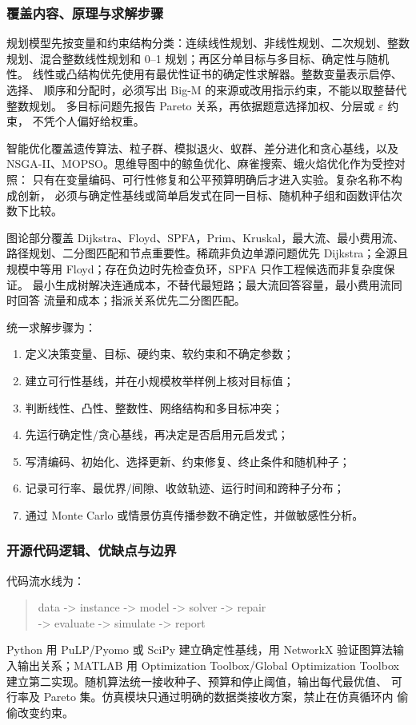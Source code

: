 \documentclass[UTF8,a4paper,12pt]{ctexart}
\begin{document}
\subsubsection{覆盖内容、原理与求解步骤}

规划模型先按变量和约束结构分类：连续线性规划、非线性规划、二次规划、整数
规划、混合整数线性规划和 0--1 规划；再区分单目标与多目标、确定性与随机性。
线性或凸结构优先使用有最优性证书的确定性求解器。整数变量表示启停、选择、
顺序和分配时，必须写出 Big-M 的来源或改用指示约束，不能以取整替代整数规划。
多目标问题先报告 Pareto 关系，再依据题意选择加权、分层或 $\varepsilon$ 约束，
不凭个人偏好给权重。

智能优化覆盖遗传算法、粒子群、模拟退火、蚁群、差分进化和贪心基线，以及
NSGA-II、MOPSO。思维导图中的鲸鱼优化、麻雀搜索、蛾火焰优化作为受控对照：
只有在变量编码、可行性修复和公平预算明确后才进入实验。复杂名称不构成创新，
必须与确定性基线或简单启发式在同一目标、随机种子组和函数评估次数下比较。

图论部分覆盖 Dijkstra、Floyd、SPFA，Prim、Kruskal，最大流、最小费用流、
路径规划、二分图匹配和节点重要性。稀疏非负边单源问题优先 Dijkstra；全源且
规模中等用 Floyd；存在负边时先检查负环，SPFA 只作工程候选而非复杂度保证。
最小生成树解决连通成本，不替代最短路；最大流回答容量，最小费用流同时回答
流量和成本；指派关系优先二分图匹配。

统一求解步骤为：
\begin{enumerate}
  \item 定义决策变量、目标、硬约束、软约束和不确定参数；
  \item 建立可行性基线，并在小规模枚举样例上核对目标值；
  \item 判断线性、凸性、整数性、网络结构和多目标冲突；
  \item 先运行确定性/贪心基线，再决定是否启用元启发式；
  \item 写清编码、初始化、选择更新、约束修复、终止条件和随机种子；
  \item 记录可行率、最优界/间隙、收敛轨迹、运行时间和跨种子分布；
  \item 通过 Monte Carlo 或情景仿真传播参数不确定性，并做敏感性分析。
\end{enumerate}

\subsubsection{开源代码逻辑、优缺点与边界}

代码流水线为：
\begin{quote}
\small\ttfamily
data -> instance -> model -> solver -> repair\\
-> evaluate -> simulate -> report
\end{quote}
Python 用 PuLP/Pyomo 或 SciPy 建立确定性基线，用
NetworkX 验证图算法输入输出关系；MATLAB 用 Optimization Toolbox/Global Optimization
Toolbox 建立第二实现。随机算法统一接收种子、预算和停止阈值，输出每代最优值、
可行率及 Pareto 集。仿真模块只通过明确的数据类接收方案，禁止在仿真循环内
偷偷改变约束。
\end{document}
